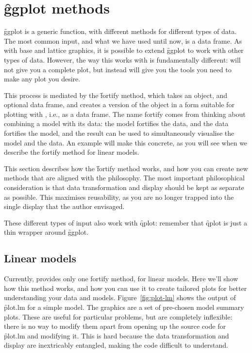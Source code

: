 {\section{\f{ggplot} methods}
\label{sec:methods}

\f{ggplot} is a generic function, with different methods for different types of data. The most common input, and what we have used until now, is a data frame. As with base and lattice graphics, it is possible to extend \f{ggplot} to work with other types of data. However, the way this works with \ggplot is fundamentally different: \ggplot will not give you a complete plot, but instead will give you the tools you need to make any plot you desire.   

This process is mediated by the \f{fortify} method, which takes an object, and optional data frame, and creates a version of the object in a form suitable for plotting with \ggplot, i.e., as a data frame. The name fortify comes from thinking about combining a model with its data: the model fortifies the data, and the data fortifies the model, and the result can be used to simultaneously visualise the model and the data. An example will make this concrete, as you will see when we describe the fortify method for linear models.  

This section describes how the \f{fortify} method works, and how you can create new methods that are aligned with the \ggplot philosophy.  The most important philosophical consideration is that data transformation and display should be kept as separate as possible.  This maximises reusability, as you are no longer trapped into the single display that the author envisaged.  

These different types of input also work with \f{qplot}: remember that \f{qplot} is just a thin wrapper around \f{ggplot}.

\subsection{Linear models}

Currently, \ggplot provides only one fortify method, for linear models. Here we'll show how this method works, and how you can use it to create tailored plots for better understanding your data and models. Figure~\ref{fig:plot-lm} shows the output of \f{plot.lm} for a simple model. The graphics are a set of pre-chosen model summary plots. These are useful for particular problems, but are completely inflexible: there is no way to modify them apart from opening up the source code for \f{plot.lm} and modifying it. This is hard because the data transformation and display are inextricably entangled, making the code difficult to understand.    

}
